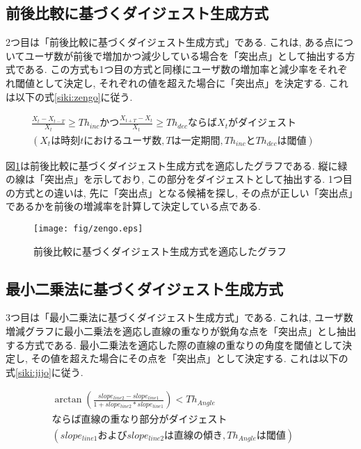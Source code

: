 \newpage

\subsection{前後比較に基づくダイジェスト生成方式}
2つ目は「前後比較に基づくダイジェスト生成方式」である. これは, ある点についてユーザ数が前後で増加かつ減少している場合を「突出点」として抽出する方式である. この方式も1つ目の方式と同様にユーザ数の増加率と減少率をそれぞれ閾値として決定し, それぞれの値を超えた場合に「突出点」を決定する. これは以下の式\ref{siki:zengo}に従う.

\begin{eqnarray}
\frac{X_{t}-X_{t-T}}{X_{t}} \geq Th_{inc}かつ\frac{X_{t+T}-X_{t}}{X_{t}} \geq Th_{dec}ならばX_{t}がダイジェスト \nonumber \\
(X_{t}は時刻tにおけるユーザ数, Tは一定期間, Th_{inc}とTh_{dec}は閾値) &&
\label{siki:zengo}
\end{eqnarray}

図\ref{fig:zengo}は前後比較に基づくダイジェスト生成方式を適応したグラフである. 縦に緑の線は「突出点」を示しており, この部分をダイジェストとして抽出する. 1つ目の方式との違いは, 先に「突出点」となる候補を探し, その点が正しい「突出点」であるかを前後の増減率を計算して決定している点である.

\begin{figure}[h]
  \centering
  \texttt{[image: fig/zengo.eps]}
  \caption{前後比較に基づくダイジェスト生成方式を適応したグラフ}
  \label{fig:zengo}
\end{figure}

\subsection{最小二乗法に基づくダイジェスト生成方式}
3つ目は「最小二乗法に基づくダイジェスト生成方式」である. これは, ユーザ数増減グラフに最小二乗法を適応し直線の重なりが鋭角な点を「突出点」とし抽出する方式である. 最小二乗法を適応した際の直線の重なりの角度を閾値として決定し, その値を超えた場合にその点を「突出点」として決定する. これは以下の式\ref{siki:jijo}に従う.

\begin{eqnarray}
\arctan \left(\frac{slope_{line2} - slope_{line1}}{1+slope_{line2}*slope_{line1}}\right) < Th_{Angle} \nonumber \\
ならば直線の重なり部分がダイジェスト \nonumber \\
(slope_{line1}およびslope_{line2}は直線の傾き, Th_{Angle}は閾値) &&
\label{siki:jijo}
\end{eqnarray}

